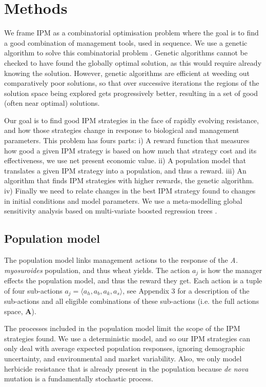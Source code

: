 \documentclass[12pt, a4paper]{article}
\begin{document}
\section*{Methods}
We frame IPM as a combinatorial optimisation problem where the goal is to find a good combination of management tools, used in sequence. We use a genetic algorithm to solve this combinatorial problem \citep{Tayl2004GA, Carr2010}. Genetic algorithms cannot be checked to have found the globally optimal solution, as this would require already knowing the solution. However, genetic algorithms are efficient at weeding out comparatively poor solutions, so that over successive iterations the regions of the solution space being explored gets progressively better, resulting in a set of good (often near optimal) solutions.

Our goal is to find good IPM strategies in the face of rapidly evolving resistance, and how those strategies change in response to biological and management parameters. This problem has fours parts: i) A reward function that measures how good a given IPM strategy is based on how much that strategy cost and its effectiveness, we use net present economic value. ii) A population model that translates a given IPM strategy into a population, and thus a reward. iii) An algorithm that finds IPM strategies with higher rewards, the genetic algorithm. iv) Finally we need to relate changes in the best IPM strategy found to changes in initial conditions and model parameters. We use a meta-modelling global sensitivity analysis \citep{Cout2014} based on multi-variate boosted regression trees \citep{Mill2016}. 

\subsection*{Population model}
The population model links management actions to the response of the \textit{A. myosuroides} population, and thus wheat yields. The action $a_j$ is how the manager effects the population model, and thus the reward they get. Each action is a tuple of four sub-actions $a_j = \langle a_h, a_b, a_k, a_s \rangle$, see Appendix 3 for a description of the sub-actions and all eligible combinations of these sub-actions (i.e. the full actions space, $\mathbf{A}$). 

The processes included in the population model limit the scope of the IPM strategies found. We use a deterministic model, and so our IPM strategies can only deal with average expected population responses, ignoring demographic uncertainty, and environmental and market variability. Also, we only model herbicide resistance that is already present in the population because \textit{de nova} mutation is a fundamentally stochastic process. 
\end{document}
